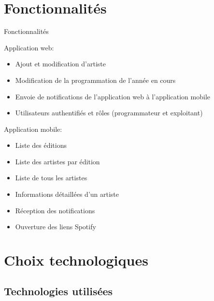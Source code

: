 \documentclass{beamer}
\begin{document}
\section{Fonctionnalités}

\begin{frame}{Fonctionnalités}

Application web:

\begin{itemize}
    \item Ajout et modification d'artiste
    \item Modification de la programmation de l'année en cours
    \item Envoie de notifications de l'application web à l'application mobile
    \item Utilisateurs authentifiés et rôles (programmateur et exploitant)
\end{itemize}

Application mobile:

\begin{itemize}
    \item Liste des éditions
    \item Liste des artistes par édition
    \item Liste de tous les artistes
    \item Informations détaillées d'un artiste
    \item Réception des notifications
    \item Ouverture des liens Spotify
\end{itemize}

\end{frame}

\section{Choix technologiques}

\subsection{Technologies utilisées}
\end{document}
